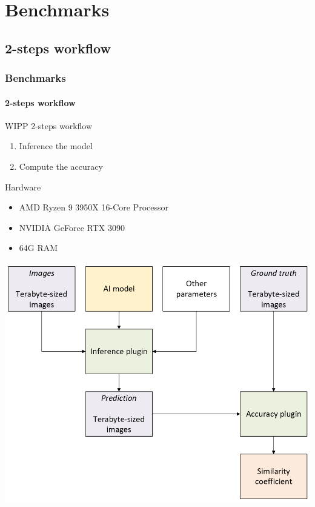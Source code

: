 \def\sectiontitle{Benchmarks}

\section{\sectiontitle}

\def\slidetitle{2-steps workflow}

\subsection{\slidetitle}
\begin{frame}
  \frametitle{\sectiontitle}
  \framesubtitle{\slidetitle}

  \begin{minipage}[h!]{0.35\textwidth}

    WIPP 2-steps workflow

    \begin{enumerate}
      \item Inference the model
      \item Compute the accuracy
    \end{enumerate}

    Hardware
    \begin{itemize}
      \item AMD Ryzen 9 3950X 16-Core Processor
      \item NVIDIA GeForce RTX 3090
      \item 64G RAM
    \end{itemize}

  \end{minipage}\hfill
  \begin{minipage}[h!]{0.65\textwidth}
    \includegraphics[scale=0.52]{./img/3_benchmark/workflow.png}
  \end{minipage}
\end{frame}

